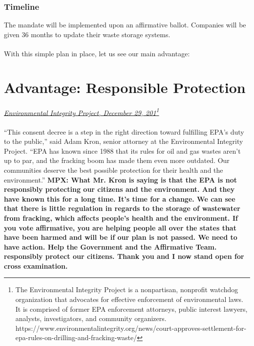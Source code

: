 \documentclass[11pt]{article}
\begin{document}
	\subsubsection{Timeline }
	The mandate will be implemented upon an affirmative ballot. Companies will be given 36 months to update their waste storage systems.
	
	\paragraph{}
	With this simple plan in place, let us see our main advantage:
	
	\section{Advantage: Responsible Protection}
	\textit{\ul{Environmental Integrity Project, December 29, 201}\footnote{The Environmental Integrity Project is a nonpartisan, nonprofit watchdog organization that advocates for effective enforcement of environmental laws. It is comprised of former EPA enforcement attorneys, public interest lawyers, analysts, investigators, and community organizers. https://www.environmentalintegrity.org/news/court-approves-settlement-for-epa-rules-on-drilling-and-fracking-waste/}}
	\paragraph{}
	``This consent decree is a step in the right direction toward fulfilling EPA’s duty to the public,'' said Adam Kron, senior attorney at the Environmental Integrity Project. ``EPA has known since 1988 that its rules for oil and gas wastes aren’t up to par, and the fracking boom has made them even more outdated. Our communities deserve the best possible protection for their health and the environment.''\newline
	\textbf{MPX: What Mr. Kron is saying is that the EPA is not responsibly protecting our citizens and the environment. And they have known this for a long time. It’s time for a change. We can see that there is little regulation in regards to the storage of wastewater from fracking, which affects people’s health and the environment. If you vote affirmative, you are helping people all over the states that have been harmed and will be if our plan is not passed. We need to have action. Help the Government and the Affirmative Team. responsibly protect our citizens. Thank you and I now stand open for cross examination.}
	
	\begin{center}
	\end{center}
\end{document}
